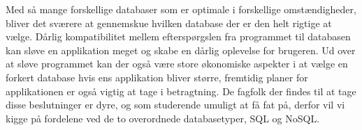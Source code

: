 Med så mange forskellige databaser som er optimale i forskellige omstændigheder, 
bliver det sværere at gennemskue hvilken database der er den helt rigtige at vælge. 
Dårlig kompatibilitet mellem efterspørgslen fra programmet til databasen kan sløve en applikation meget 
og skabe en dårlig oplevelse for brugeren. 
Ud over at sløve programmet kan der også være store økonomiske aspekter i at vælge en 
forkert database hvis ens applikation bliver større, fremtidig planer for applikationen er 
også vigtig at tage i betragtning. De fagfolk der findes til at tage disse beslutninger er dyre, 
og som studerende umuligt at få fat på, derfor vil vi kigge på fordelene ved de to overordnede databasetyper, 
SQL og NoSQL.
